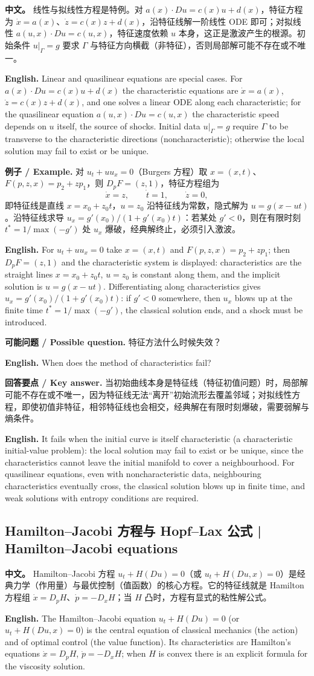 \documentclass[UTF8,11pt,a4paper]{ctexart}
\newcommand{\APS}[2]{\par\noindent\textbf{中文。} #1\par\noindent\textbf{English.} #2\par\smallskip}
\newcommand{\EN}[1]{\par\noindent \textbf{English.} #1\par}
\newcommand{\EX}[2]{\par\noindent \textbf{例子 / Example.} #1\par\EN{#2}}
\newcommand{\ASK}[4]{\par\noindent \textbf{可能问题 / Possible question.} #1\par\EN{#2}\noindent \textbf{回答要点 / Key answer.} #3\par\EN{#4}\medskip}
\begin{document}
\APS{线性与拟线性方程是特例。对 $a(x)\cdot Du=c(x)u+d(x)$，特征方程为 $\dot x=a(x)$、$\dot z=c(x)z+d(x)$，沿特征线解一阶线性 ODE 即可；对拟线性 $a(u,x)\cdot Du=c(u,x)$，特征速度依赖 $u$ 本身，这正是激波产生的根源。初始条件 $u|_\Gamma=g$ 要求 $\Gamma$ 与特征方向横截（非特征），否则局部解可能不存在或不唯一。}{Linear and quasilinear equations are special cases. For $a(x)\cdot Du=c(x)u+d(x)$ the characteristic equations are $\dot x=a(x)$, $\dot z=c(x)z+d(x)$, and one solves a linear ODE along each characteristic; for the quasilinear equation $a(u,x)\cdot Du=c(u,x)$ the characteristic speed depends on $u$ itself, the source of shocks. Initial data $u|_\Gamma=g$ require $\Gamma$ to be transverse to the characteristic directions (noncharacteristic); otherwise the local solution may fail to exist or be unique.}

\EX{对 $u_t+uu_x=0$（Burgers 方程）取 $x=(x,t)$、$F(p,z,x)=p_2+zp_1$，则 $D_pF=(z,1)$，特征方程组为
\[
\dot x=z,\qquad \dot t=1,\qquad \dot z=0,
\]
即特征线是直线 $x=x_0+z_0t$，$u=z_0$ 沿特征线为常数，隐式解为 $u=g(x-ut)$。沿特征线求导 $u_x=g'(x_0)/(1+g'(x_0)t)$：若某处 $g'<0$，则在有限时刻 $t^*=1/\max(-g')$ 处 $u_x$ 爆破，经典解终止，必须引入激波。}{For $u_t+uu_x=0$ take $x=(x,t)$ and $F(p,z,x)=p_2+zp_1$; then $D_pF=(z,1)$ and the characteristic system is displayed: characteristics are the straight lines $x=x_0+z_0t$, $u=z_0$ is constant along them, and the implicit solution is $u=g(x-ut)$. Differentiating along characteristics gives $u_x=g'(x_0)/(1+g'(x_0)t)$: if $g'<0$ somewhere, then $u_x$ blows up at the finite time $t^*=1/\max(-g')$, the classical solution ends, and a shock must be introduced.}

\ASK{特征方法什么时候失效？}{When does the method of characteristics fail?}{当初始曲线本身是特征线（特征初值问题）时，局部解可能不存在或不唯一，因为特征线无法``离开''初始流形去覆盖邻域；对拟线性方程，即使初值非特征，相邻特征线也会相交，经典解在有限时刻爆破，需要弱解与熵条件。}{It fails when the initial curve is itself characteristic (a characteristic initial-value problem): the local solution may fail to exist or be unique, since the characteristics cannot leave the initial manifold to cover a neighbourhood. For quasilinear equations, even with noncharacteristic data, neighbouring characteristics eventually cross, the classical solution blows up in finite time, and weak solutions with entropy conditions are required.}

\subsection{Hamilton--Jacobi 方程与 Hopf--Lax 公式 | Hamilton--Jacobi equations}
\APS{Hamilton--Jacobi 方程 $u_t+H(Du)=0$（或 $u_t+H(Du,x)=0$）是经典力学（作用量）与最优控制（值函数）的核心方程。它的特征线就是 Hamilton 方程组 $\dot x=D_pH$、$\dot p=-D_xH$；当 $H$ 凸时，方程有显式的粘性解公式。}{The Hamilton--Jacobi equation $u_t+H(Du)=0$ (or $u_t+H(Du,x)=0$) is the central equation of classical mechanics (the action) and of optimal control (the value function). Its characteristics are Hamilton's equations $\dot x=D_pH$, $\dot p=-D_xH$; when $H$ is convex there is an explicit formula for the viscosity solution.}
\end{document}
